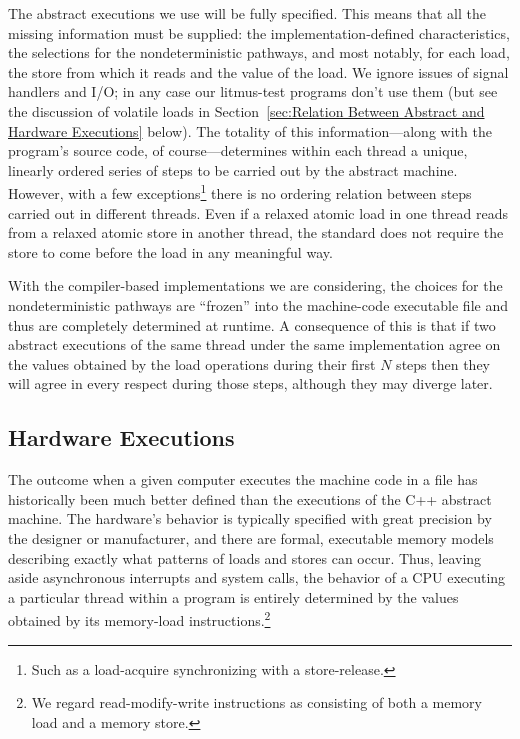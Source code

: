 The abstract executions we use will be fully specified.
This means that all the missing information must be supplied:
the implementation-defined characteristics, the selections for the
nondeterministic pathways, and most notably, for each load, the store
from which it reads and the value of the load.
We ignore issues of signal handlers and I/O;
in any case our litmus-test programs don't use them
(but see the discussion of volatile loads in
Section~\ref{sec:Relation Between Abstract and Hardware Executions} below).
The totality of this information---along with the program's source
code, of course---determines within each thread a unique, linearly
ordered series of steps to be carried out by the abstract machine.
However, with a few exceptions\footnote{
	Such as a load-acquire synchronizing with a store-release.}
there is no ordering relation between steps carried out
in different threads.
Even if a relaxed atomic load in one thread reads from a relaxed
atomic store in another thread, the standard does not require the
store to come before the load in any meaningful way.

With the compiler-based implementations we are considering,
the choices for the nondeterministic pathways are ``frozen'' into the
machine-code executable file and thus are completely determined
at runtime.
A consequence of this is that if two abstract executions of the same
thread under the same implementation agree on the values obtained by
the load operations during their first $N$ steps then they will agree
in every respect during those steps, although they may diverge later.

\subsection{Hardware Executions}
\label{sec:Hardware Executions}

The outcome when a given computer executes the machine code in a file
has historically been much better defined than the executions of the
C++ abstract machine.
The hardware's behavior is typically specified with great precision by
the designer or manufacturer, and there are formal, executable memory models
describing exactly what patterns of loads and stores can occur.
Thus, leaving aside asynchronous interrupts and system
calls, the behavior of a CPU executing a particular thread within a
program is entirely determined by the values obtained by its
memory-load instructions.\footnote{
	We regard read-modify-write instructions as consisting of both a
	memory load and a memory store.}

